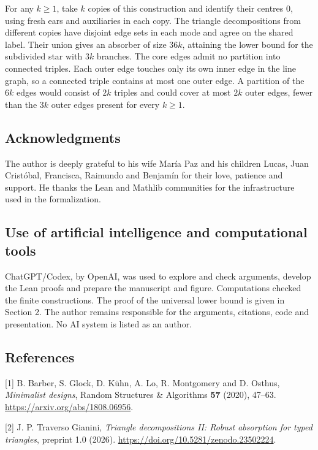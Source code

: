 \documentclass[english,11pt,a4paper]{article}
\begin{document}
For any \(k\ge1\), take \(k\) copies of this construction and identify their centres \(0\), using fresh ears and auxiliaries in each copy. The triangle decompositions from different copies have disjoint edge sets in each mode and agree on the shared label. Their union gives an absorber of size \(36k\), attaining the lower bound for the subdivided star with \(3k\) branches. The core edges admit no partition into connected triples. Each outer edge touches only its own inner edge in the line graph, so a connected triple contains at most one outer edge. A partition of the \(6k\) edges would consist of \(2k\) triples and could cover at most \(2k\) outer edges, fewer than the \(3k\) outer edges present for every \(k\ge1\).

\subsection{Acknowledgments}\label{acknowledgments}

The author is deeply grateful to his wife María Paz and his children Lucas, Juan Cristóbal, Francisca, Raimundo and Benjamín for their love, patience and support. He thanks the Lean and Mathlib communities for the infrastructure used in the formalization.

\subsection{Use of artificial intelligence and computational tools}\label{use-of-artificial-intelligence-and-computational-tools}

ChatGPT/Codex, by OpenAI, was used to explore and check arguments, develop the Lean proofs and prepare the manuscript and figure. Computations checked the finite constructions. The proof of the universal lower bound is given in Section 2. The author remains responsible for the arguments, citations, code and presentation. No AI system is listed as an author.

\subsection{References}\label{references}

{[}1{]} B. Barber, S. Glock, D. Kühn, A. Lo, R. Montgomery and D. Osthus, \emph{Minimalist designs}, Random Structures \& Algorithms \textbf{57} (2020), 47--63. \url{https://arxiv.org/abs/1808.06956}.

{[}2{]} J. P. Traverso Gianini, \emph{Triangle decompositions II: Robust absorption for typed triangles}, preprint 1.0 (2026). \url{https://doi.org/10.5281/zenodo.23502224}.
\end{document}
